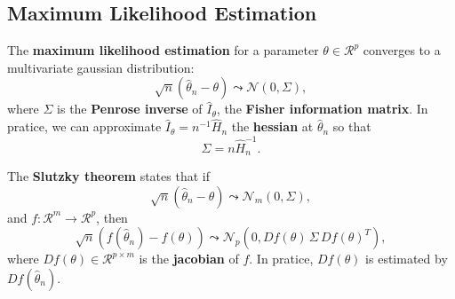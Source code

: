 \documentclass[10pt]{article}
\newcommand{\real}{\mathscr{R}}
\newcommand{\normal}{\mathscr{N}}
\begin{document}
\subsection{Maximum Likelihood Estimation}
\begin{outline}
  \1 The \textbf{maximum likelihood estimation} for a parameter $\theta \in \real^p$
  converges to a multivariate gaussian distribution:
  \begin{equation*}
    \sqrt{n}(\hat\theta_n - \theta) \leadsto \normal(0,\Sigma),
  \end{equation*}
  where $\Sigma$ is the \textbf{Penrose inverse} of $\hat I_\theta$, the \textbf{Fisher
    information matrix}. In pratice, we can approximate $\hat I_\theta = n^{-1}\hat H_n$
  the \textbf{hessian} at $\hat\theta_n$ so that
  \begin{equation*}
    \Sigma = n\hat H_n^{-1}.
  \end{equation*}

  \1 The \textbf{Slutzky theorem} states that if 
  \begin{equation*}
    \sqrt{n}(\hat\theta_n - \theta) \leadsto \normal_m(0,\Sigma),
  \end{equation*}
  and $f:\real^m\to\real^p$, then 
  \begin{equation*}
    \sqrt{n}(f(\hat\theta_n) - f(\theta)) \leadsto \normal_p(0,Df(\theta)\,\Sigma\,Df(\theta)^T),
  \end{equation*}
  where $Df(\theta)\in\real^{p\times m}$ is the \textbf{jacobian} of $f$. In pratice,
  $Df(\theta)$ is estimated by $Df(\hat\theta_n)$.
\end{outline}
\end{document}
